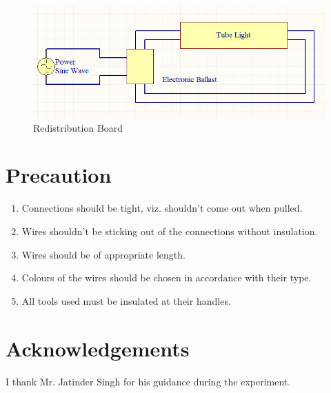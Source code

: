 	\begin{figure}[bth]
		\begin{center}
			\includegraphics[width=1.2\linewidth]{gfx/circuit4}
		\end{center}
	\caption[Redistribution Board]{Redistribution Board}\label{E4_fig1}
	\end{figure}

\section{Precaution}
	\begin{enumerate}
		\item Connections should be tight, viz. shouldn't come out when pulled.
		\item Wires shouldn't be sticking out of the connections without insulation.
		\item Wires should be of appropriate length.
		\item Colours of the wires should be chosen in accordance with their type.
		\item All tools used must be insulated at their handles.
	\end{enumerate}	
\section{Acknowledgements}
I thank Mr. Jatinder Singh for his guidance during the experiment.